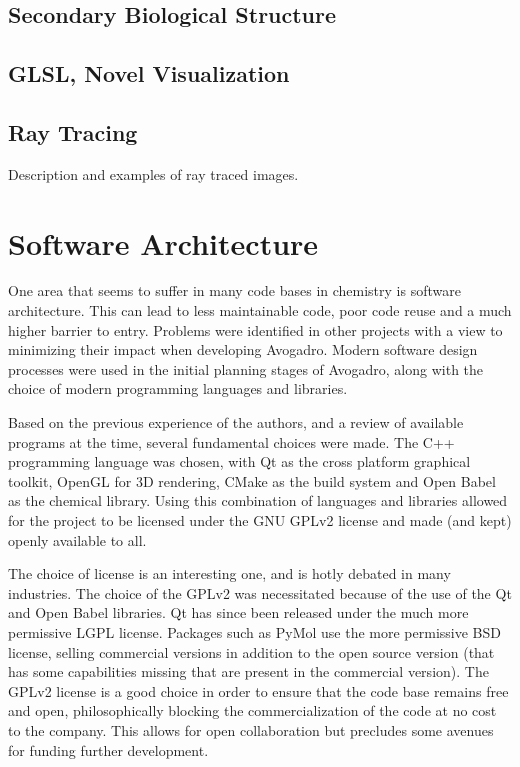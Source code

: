 \documentclass{article}
\begin{document}
\subsection{Secondary Biological Structure} %

\subsection{GLSL, Novel Visualization}



\subsection{Ray Tracing}

Description and examples of ray traced images.

\section{Software Architecture}

One area that seems to suffer in many code bases in chemistry is software architecture. This can lead to less maintainable code, poor code reuse and a much higher barrier to entry. Problems were identified in other projects with a view to minimizing their impact when developing Avogadro. Modern software design processes were used in the initial planning stages of Avogadro, along with the choice of modern programming languages and libraries.

Based on the previous experience of the authors, and a review of available programs at the time, several fundamental choices were made. The C++ programming language was chosen, with Qt as the cross platform graphical toolkit, OpenGL for 3D rendering, CMake as the build system and Open Babel as the chemical library. Using this combination of languages and libraries allowed for the project to be licensed under the GNU GPLv2 license and made (and kept) openly available to all.

The choice of license is an interesting one, and is hotly debated in many industries. The choice of the GPLv2 was necessitated because of the use of the Qt and Open Babel libraries. Qt has since been released under the much more permissive LGPL license. Packages such as PyMol use the more permissive BSD license, selling commercial versions in addition to the open source version (that has some capabilities missing that are present in the commercial version). The GPLv2 license is a good choice in order to ensure that the code base remains free and open, philosophically blocking the commercialization of the code at no cost to the company. This allows for open collaboration but precludes some avenues for funding further development.
\end{document}
